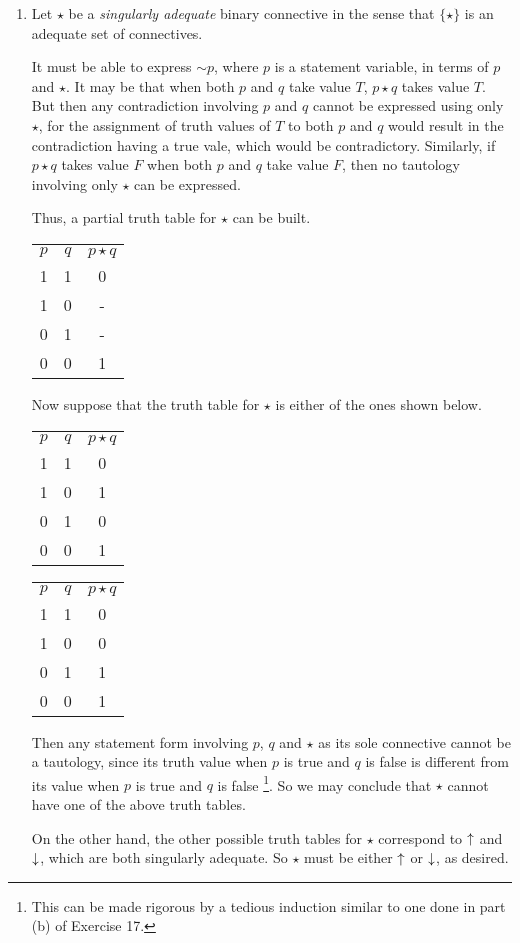 \begin{enumerate}
  \item %
    Let \(\star\) be a \textit{singularly adequate} binary connective in the sense that \(\{\star\}\) is an adequate set of connectives. 

    It must be able to express \(\sim p\), where \(p\) is a statement variable, in terms of \(p\) and \(\star\). It may be that when both \(p\) and \(q\) take value \(T\), \(p \star q\) takes value \(T\). But then any contradiction involving \(p\) and \(q\) cannot be expressed using only \(\star\), for the assignment of truth values of \(T\) to both \(p\) and \(q\) would result in the contradiction having a true vale, which would be contradictory. Similarly, if \(p \star q\) takes value \(F\) when both \(p\) and \(q\) take value \(F\), then no tautology involving only \(\star\) can be expressed.

    Thus, a partial truth table for \(\star\) can be built.
    \begin{center}
      \begin{tabular}{ccc}
        \(p\)   &\(q\)  &\(p \star q\)\\
        1       &1      &0\\
        1       &0      &-\\
        0       &1      &-\\
        0       &0      &1
      \end{tabular}
    \end{center}
  Now suppose that the truth table for \(\star\) is either of the ones shown below.
    \begin{center}
      \begin{tabular}{ccc}
        \(p\)   &\(q\)  &\(p \star q\)\\
        1       &1      &0\\
        1       &0      &1\\
        0       &1      &0\\
        0       &0      &1
      \end{tabular}

      \begin{tabular}{ccc}
        \(p\)   &\(q\)  &\(p \star q\)\\
        1       &1      &0\\
        1       &0      &0\\
        0       &1      &1\\
        0       &0      &1
      \end{tabular}
    \end{center}
    Then any statement form involving \(p\), \(q\) and \(\star\) as its sole connective cannot be a tautology, since its truth value when \(p\) is true and \(q\) is false is different from its value when \(p\) is true and \(q\) is false \footnote{This can be made rigorous by a tedious induction similar to one done in part (b) of Exercise 17.}. So we may conclude that \(\star\) cannot have one of the above truth tables.
    

  On the other hand, the other possible truth tables for \(\star\) correspond to \(\uparrow\) and \(\downarrow\), which are both singularly adequate. So \(\star\) must be either \(\uparrow\) or \(\downarrow\), as desired.

\end{enumerate}
